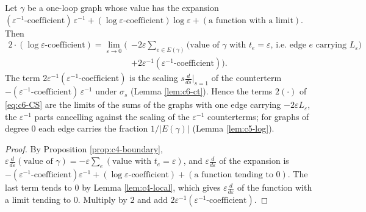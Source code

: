 \begin{proposition}
\label{prop:c6-Leps}
Let $\gamma$ be a one-loop graph whose value has the expansion $(\varepsilon^{-1}\text{-coefficient})\,\varepsilon^{-1}+(\log\varepsilon\text{-coefficient})\log\varepsilon+(\text{a function with a limit})$. Then
\[
\begin{aligned}
2\cdot(\log\varepsilon\text{-coefficient})=\lim_{\varepsilon\to0}\Big(&-2\varepsilon\sum_{e\in E(\gamma)}\big(\text{value of }\gamma\text{ with }t_e=\varepsilon\text{, i.e. edge }e\text{ carrying }L_\varepsilon\big)\\
&+2\varepsilon^{-1}(\varepsilon^{-1}\text{-coefficient})\Big).
\end{aligned}
\]
The term $2\varepsilon^{-1}(\varepsilon^{-1}\text{-coefficient})$ is the scaling $s\frac{d}{ds}\big|_{s=1}$ of the counterterm $-(\varepsilon^{-1}\text{-coefficient})\,\varepsilon^{-1}$ under $\sigma_s$ (Lemma \ref{lem:c6-ct}). Hence the terms $2(\cdot)$ of \eqref{eq:c6-CS} are the limits of the sums of the graphs with one edge carrying $-2\varepsilon L_\varepsilon$, the $\varepsilon^{-1}$ parts cancelling against the scaling of the $\varepsilon^{-1}$ counterterms; for graphs of degree $0$ each edge carries the fraction $1/|E(\gamma)|$ (Lemma \ref{lem:c5-log}).
\end{proposition}

\begin{proof}
By Proposition \ref{prop:c4-boundary}, $\varepsilon\frac{d}{d\varepsilon}(\text{value of }\gamma)=-\varepsilon\sum_e(\text{value with }t_e=\varepsilon)$, and $\varepsilon\frac{d}{d\varepsilon}$ of the expansion is $-(\varepsilon^{-1}\text{-coefficient})\varepsilon^{-1}+(\log\varepsilon\text{-coefficient})+(\text{a function tending to }0)$. The last term tends to $0$ by Lemma \ref{lem:c4-local}, which gives $\varepsilon\frac{d}{d\varepsilon}$ of the function with a limit tending to $0$. Multiply by $2$ and add $2\varepsilon^{-1}(\varepsilon^{-1}\text{-coefficient})$.
\end{proof}


